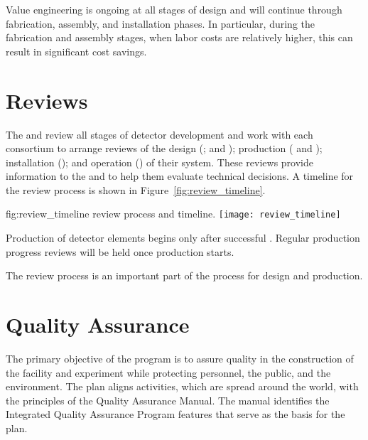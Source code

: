 Value engineering is ongoing at all stages of design and will continue
through fabrication, assembly, and installation phases. In
particular, during the fabrication and assembly stages, when labor costs
are relatively higher, this can result in significant cost savings. 

\section{Reviews}
\label{sec:es-tc-reviews}


The  and  review all stages of detector development
and work with each consortium to arrange reviews of the design
(;  and ); production (
and ); installation (); and operation
() of their system.  These reviews provide information to
the  and  to help them evaluate technical
decisions. A timeline for the review process is shown in
Figure~\ref{fig:review_timeline}.
\begin{dunefigure}{fig:review_timeline}
  { review process and timeline.}
  \texttt{[image: review\_timeline]}
\end{dunefigure}

Production of detector elements begins only after successful
. Regular production progress reviews will be held once
production starts. 

The review process is an important part of the  
process for design and production.

\section{Quality Assurance}
\label{sec:es-tc-qa}

The primary objective of the   program is
to assure quality in the construction of the  facility and
 experiment while protecting
 personnel, the public, and the environment. The
 plan aligns   activities, which
are spread around the world, with the principles of the \fnal Quality
Assurance Manual. The manual identifies the \fnal Integrated Quality
Assurance Program features that serve as the basis for the
  plan.

